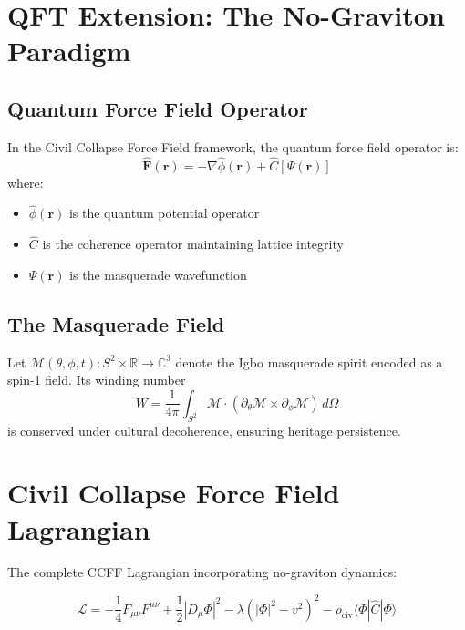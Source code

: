 \documentclass[11pt, a4paper]{article}
\begin{document}
\section{QFT Extension: The No-Graviton Paradigm}

\subsection{Quantum Force Field Operator}

\begin{definition}
In the Civil Collapse Force Field framework, the quantum force field operator is:
\[
\hat{\mathbf{F}}(\mathbf{r}) = -\nabla\hat{\phi}(\mathbf{r}) + \hat{C}[\Psi(\mathbf{r})]
\]
where:
\begin{itemize}
\item $\hat{\phi}(\mathbf{r})$ is the quantum potential operator
\item $\hat{C}$ is the coherence operator maintaining lattice integrity
\item $\Psi(\mathbf{r})$ is the masquerade wavefunction
\end{itemize}
\end{definition}

\subsection{The Masquerade Field}

\begin{definition}
Let $\mathcal{M}(\theta, \phi, t): S^2 \times \mathbb{R} \to \mathbb{C}^3$ denote the Igbo masquerade spirit encoded as a spin-1 field. Its winding number
\[
W = \frac{1}{4\pi}\int_{S^2} \mathcal{M} \cdot (\partial_\theta\mathcal{M} \times \partial_\phi\mathcal{M})\,d\Omega
\]
is conserved under cultural decoherence, ensuring heritage persistence.
\end{definition}

\section{Civil Collapse Force Field Lagrangian}

The complete CCFF Lagrangian incorporating no-graviton dynamics:

\begin{equation}
\mathcal{L} = -\frac{1}{4}F_{\mu\nu}F^{\mu\nu} + \frac{1}{2}|D_\mu\Phi|^2 - \lambda(|\Phi|^2 - v^2)^2 - \rho_{\text{civ}}\langle\Phi|\hat{C}|\Phi\rangle
\end{equation}
\end{document}

